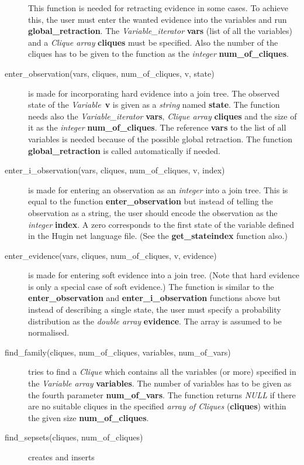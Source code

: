 \documentclass[12pt,a4paper]{report}
\begin{document}
\begin{description}
This function is needed for retracting evidence in some cases. To
achieve this, the user must enter the wanted evidence into the
variables and run \textbf{global\_retraction}. The 
{\it Variable\_iterator} \textbf{vars} (list of all the variables) and 
a {\it Clique array} \textbf{cliques} must be specified. Also the
number of the cliques has to be given to the function as the {\it
integer} \textbf{num\_of\_cliques}.
\item[enter\_observation(vars, cliques, num\_of\_cliques, v, state)] 
is made for incorporating hard evidence into a join tree. The observed
state of the {\it Variable}~\textbf{v} is given as a {\it string} named
\textbf{state}. The function needs also the {\it Variable\_iterator}
\textbf{vars}, {\it Clique array} \textbf{cliques} and the size of it
as the {\it integer} \textbf{num\_of\_cliques}. The reference
\textbf{vars} to the list of all variables is needed because of the
possible global retraction. The function \textbf{global\_retraction}
is called automatically if needed.
\item[enter\_i\_observation(vars, cliques, num\_of\_cliques, v, index)]
is made for entering an observation as an {\it integer} into a join
tree. This is equal to the function \textbf{enter\_observation} but
instead of telling the observation as a string, the user should encode
the observation as the {\it integer} \textbf{index}. A zero
corresponds to the first state of the variable defined in the Hugin
net language file. (See the \textbf{get\_stateindex} function also.)
\item[enter\_evidence(vars, cliques, num\_of\_cliques, v, evidence)]
is made for entering soft evidence into a join tree. (Note that hard
evidence is only a special case of soft evidence.) The function is
similar to the \textbf{enter\_observation} and
\textbf{enter\_i\_observation} functions above but instead of
describing a single state, the user must specify a probability
distribution as the {\it double array} \textbf{evidence}. The array is
assumed to be normalised.
\item[find\_family(cliques, num\_of\_cliques, variables, num\_of\_vars)]
tries to find a {\it Clique} which contains all the variables (or
more) specified in the {\it Variable array} \textbf{variables}. The 
number of variables has to be given as the fourth parameter 
\textbf{num\_of\_vars}. The function returns {\it NULL} if there are
no suitable cliques in the specified {\it array of Cliques} 
(\textbf{cliques}) within the given size \textbf{num\_of\_cliques}.
\item[find\_sepsets(cliques, num\_of\_cliques)] creates and inserts 

\end{description}
\end{document}
